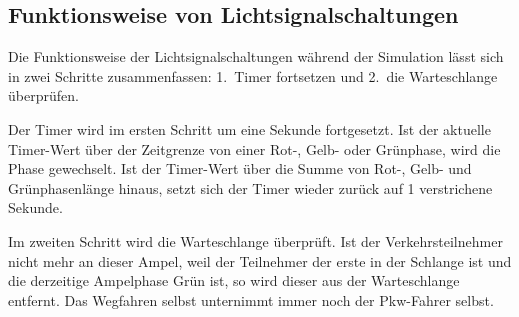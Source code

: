 %

\subsection{Funktionsweise von Lichtsignalschaltungen}\label{subsec:workings}

Die Funktionsweise der Lichtsignalschaltungen während der Simulation lässt sich in zwei Schritte zusammenfassen: 1.\ Timer fortsetzen und 2.\ die Warteschlange überprüfen.

Der Timer wird im ersten Schritt um eine Sekunde fortgesetzt.
Ist der aktuelle Timer-Wert über der Zeitgrenze von einer Rot-, Gelb- oder Grünphase, wird die Phase gewechselt.
Ist der Timer-Wert über die Summe von Rot-, Gelb- und Grünphasenlänge hinaus, setzt sich der Timer wieder zurück auf 1 verstrichene Sekunde.

Im zweiten Schritt wird die Warteschlange überprüft.
Ist der Verkehrsteilnehmer nicht mehr an dieser Ampel, weil der Teilnehmer der erste in der Schlange ist und die derzeitige Ampelphase Grün ist, so wird dieser aus der Warteschlange entfernt.
Das Wegfahren selbst unternimmt immer noch der Pkw-Fahrer selbst.
